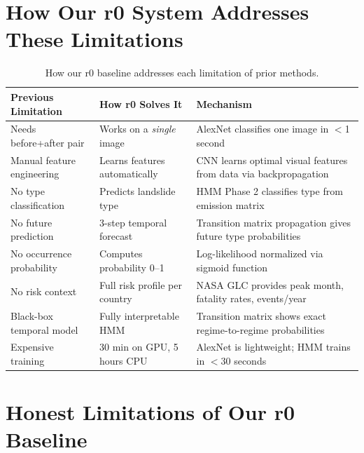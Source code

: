 \documentclass[11pt]{article}
\begin{document}
\section{How Our r0 System Addresses These Limitations}

\begin{table}[H]
\centering
\footnotesize
\begin{tabular}{@{}p{4cm}p{4.5cm}p{5cm}@{}}
\toprule
\textbf{Previous Limitation} & \textbf{How r0 Solves It} & \textbf{Mechanism} \\
\midrule
Needs before+after pair & Works on a \emph{single} image & AlexNet classifies one image in $<$1 second \\
\addlinespace
Manual feature engineering & Learns features automatically & CNN learns optimal visual features from data via backpropagation \\
\addlinespace
No type classification & Predicts landslide type & HMM Phase 2 classifies type from emission matrix \\
\addlinespace
No future prediction & 3-step temporal forecast & Transition matrix propagation gives future type probabilities \\
\addlinespace
No occurrence probability & Computes probability 0--1 & Log-likelihood normalized via sigmoid function \\
\addlinespace
No risk context & Full risk profile per country & NASA GLC provides peak month, fatality rates, events/year \\
\addlinespace
Black-box temporal model & Fully interpretable HMM & Transition matrix shows exact regime-to-regime probabilities \\
\addlinespace
Expensive training & 30 min on GPU, 5 hours CPU & AlexNet is lightweight; HMM trains in $<$30 seconds \\
\bottomrule
\end{tabular}
\caption{How our r0 baseline addresses each limitation of prior methods.}
\end{table}

\section{Honest Limitations of Our r0 Baseline}
\end{document}
